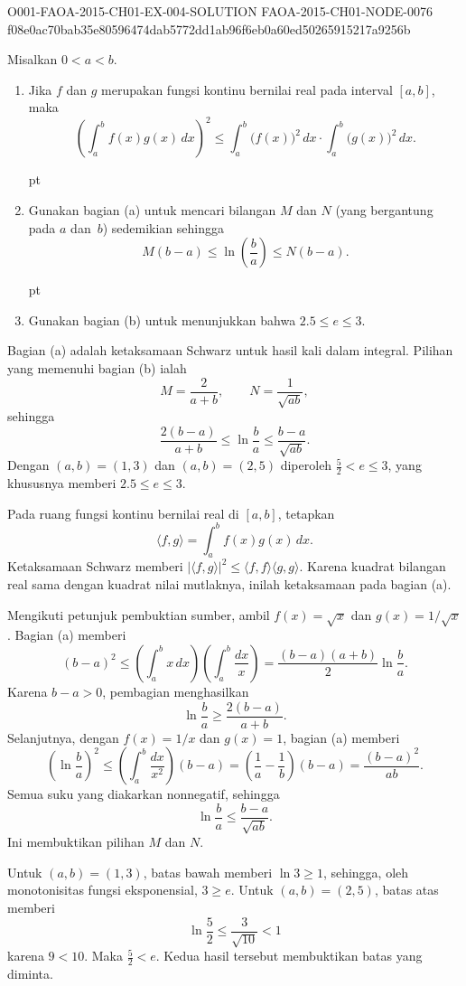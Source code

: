 \begin{o001solution}
  {O001-FAOA-2015-CH01-EX-004-SOLUTION}
  {FAOA-2015-CH01-NODE-0076}
  {f08e0ac70bab35e80596474dab5772dd1ab96f6eb0a60ed50265915217a9256b}
\begin{o001statement}
Misalkan $0 < a < b$.
 \begin{enumerate}
  \item Jika $f$ dan $g$ merupakan fungsi kontinu bernilai real pada
interval $[a,b]$, maka
   \[\left(\int_a^b f(x)g(x)\,dx\right)^2
             \le \int_a^b\bigl(f(x)\bigr)^2\,dx \cdot
                       \int_a^b\bigl(g(x)\bigr)^2\,dx.\]

 pt

  \item Gunakan bagian (a) untuk mencari bilangan $M$ dan $N$ (yang bergantung pada $a$
dan~$b$) sedemikian sehingga
   \[M(b-a) \le \ln\left(\frac ba\right) \le N(b-a).\]

 pt

  \item Gunakan bagian (b) untuk menunjukkan bahwa $2.5 \le e \le 3$.
 \end{enumerate}
\end{o001statement}
\begin{o001answer}
Bagian (a) adalah ketaksamaan Schwarz untuk hasil kali dalam integral. Pilihan
yang memenuhi bagian (b) ialah
\[
 M=\frac{2}{a+b},\qquad N=\frac1{\sqrt{ab}},
\]
sehingga
\[
\frac{2(b-a)}{a+b}\le\ln\frac ba
\le\frac{b-a}{\sqrt{ab}}.
\]
Dengan $(a,b)=(1,3)$ dan $(a,b)=(2,5)$ diperoleh
$\frac52<e\le3$, yang khususnya memberi $2.5\le e\le3$.
\end{o001answer}
\begin{o001proof}
Pada ruang fungsi kontinu bernilai real di $[a,b]$, tetapkan
\[
\langle f,g\rangle=\int_a^b f(x)g(x)\,dx.
\]
Ketaksamaan Schwarz memberi
$|\langle f,g\rangle|^2\le\langle f,f\rangle\langle g,g\rangle$.
Karena kuadrat bilangan real sama dengan kuadrat nilai mutlaknya, inilah
ketaksamaan pada bagian (a).

Mengikuti petunjuk pembuktian sumber, ambil
$f(x)=\sqrt{x}$ dan $g(x)=1/\sqrt{x}$. Bagian (a) memberi
\[
(b-a)^2
\le\left(\int_a^b x\,dx\right)\left(\int_a^b\frac{dx}{x}\right)
=\frac{(b-a)(a+b)}2\ln\frac ba.
\]
Karena $b-a>0$, pembagian menghasilkan
\[
\ln\frac ba\ge\frac{2(b-a)}{a+b}.
\]
Selanjutnya, dengan $f(x)=1/x$ dan $g(x)=1$, bagian (a) memberi
\[
\left(\ln\frac ba\right)^2
\le\left(\int_a^b\frac{dx}{x^2}\right)(b-a)
=\left(\frac1a-\frac1b\right)(b-a)
=\frac{(b-a)^2}{ab}.
\]
Semua suku yang diakarkan nonnegatif, sehingga
\[
\ln\frac ba\le\frac{b-a}{\sqrt{ab}}.
\]
Ini membuktikan pilihan $M$ dan $N$.

Untuk $(a,b)=(1,3)$, batas bawah memberi $\ln3\ge1$, sehingga, oleh
monotonisitas fungsi eksponensial, $3\ge e$. Untuk $(a,b)=(2,5)$, batas atas
memberi
\[
\ln\frac52\le\frac3{\sqrt{10}}<1
\]
karena $9<10$. Maka $\frac52<e$. Kedua hasil tersebut membuktikan batas yang
diminta.
\end{o001proof}
\end{o001solution}

